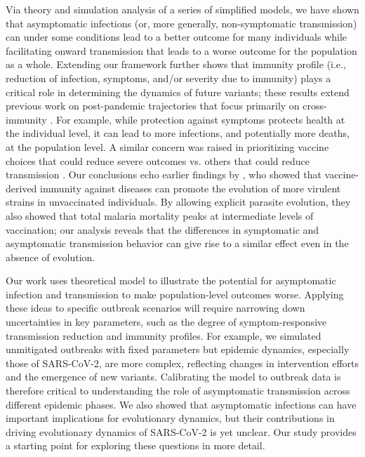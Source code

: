 \documentclass[12pt]{article}
\begin{document}
Via theory and simulation analysis of a series of simplified models, we have shown that asymptomatic infections (or, more generally, non-symptomatic transmission) can under some conditions lead to a better outcome for many individuals while facilitating onward transmission that leads to a worse outcome for the population as a whole.
Extending our framework further shows that immunity profile (i.e., reduction of infection, symptoms, and/or severity due to immunity) plays a critical role in determining the dynamics of future variants;
these results extend previous work on post-pandemic trajectories that focus primarily on cross-immunity \cite{kissler2020projecting,lavine2021immunological}.
For example, while protection against symptoms protects health at the individual level, it can lead to more infections, and potentially more deaths, at the population level.
A similar concern was raised in prioritizing vaccine choices that could reduce severe outcomes vs. others that could reduce transmission \cite{koelle2022changing}.
Our conclusions echo earlier findings by \cite{gandon2001imperfect}, who showed that vaccine-derived immunity against diseases can promote the evolution of more virulent strains in unvaccinated individuals.
By allowing explicit parasite evolution, they also showed that total malaria mortality peaks at intermediate levels of vaccination; our analysis reveals that the differences in symptomatic and asymptomatic transmission behavior can give rise to a similar effect even in the absence of evolution.  

Our work uses theoretical model to illustrate the potential for asymptomatic infection and transmission to make population-level outcomes worse.
Applying these ideas to specific outbreak scenarios will require narrowing down uncertainties in key parameters, such as the degree of symptom-responsive transmission reduction and immunity profiles.
For example, we simulated unmitigated outbreaks with fixed parameters but epidemic dynamics, especially those of SARS-CoV-2, are more complex, reflecting changes in intervention efforts and the emergence of new variants.
Calibrating the model to outbreak data is therefore critical to understanding the role of asymptomatic transmission across different epidemic phases.
We also showed that asymptomatic infections can have important implications for evolutionary dynamics, but their contributions in driving evolutionary dynamics of SARS-CoV-2 is yet unclear.
Our study provides a starting point for exploring these questions in more detail.
\end{document}
